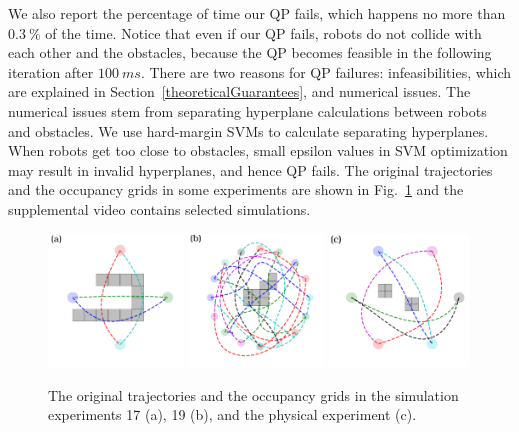 \documentclass{svproc}
\begin{document}
We also report the percentage of time our QP fails, which happens no more than $\SI{0.3}{\percent}$ of the time. Notice that even if our QP fails, robots do not collide with each other and the obstacles, because the QP becomes feasible in the following iteration after $\SI{100}{ms}$. There are two reasons for QP failures: infeasibilities, which are explained in Section~\ref{theoreticalGuarantees}, and numerical issues. The numerical issues stem from separating hyperplane calculations between robots and obstacles. We use hard-margin SVMs to calculate separating hyperplanes. When robots get too close to obstacles, small epsilon values in SVM optimization may result in invalid hyperplanes, and hence QP fails.
The original trajectories and the occupancy grids in some experiments are shown in Fig.~\ref{fig:examples} and the supplemental video contains selected simulations.

\begin{figure}
\centering
\includegraphics[width=0.32\textwidth]{images/ex_17.pdf}
\hfill
\includegraphics[width=0.32\textwidth]{images/ex_19.pdf}
\hfill
\includegraphics[width=0.33\textwidth]{images/physical.pdf}
\caption{
The original trajectories and the occupancy grids in the simulation experiments 17 (a), 19 (b), and the physical experiment (c).
}
\label{fig:examples}
\end{figure}
\end{document}
